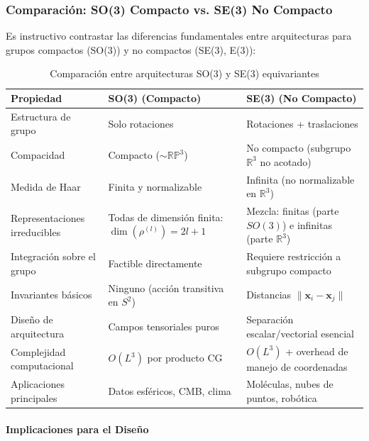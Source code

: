 \subsubsection{Comparación: SO(3) Compacto vs. SE(3) No Compacto}\label{subsubsec:so3_vs_se3_comparison}

Es instructivo contrastar las diferencias fundamentales entre arquitecturas para grupos compactos (SO(3)) y no compactos (SE(3), E(3)):

\begin{table}[h]
\centering
\begin{tabular}{|p{}|p{}|p{}|}
\hline
\textbf{Propiedad} & \textbf{SO(3) (Compacto)} & \textbf{SE(3) (No Compacto)} \\
\hline
Estructura de grupo & Solo rotaciones & Rotaciones + traslaciones \\
\hline
Compacidad & Compacto ($\sim \mathbb{RP}^3$) & No compacto (subgrupo $\mathbb{R}^3$ no acotado) \\
\hline
Medida de Haar & Finita y normalizable & Infinita (no normalizable en $\mathbb{R}^3$) \\
\hline
Representaciones irreducibles & Todas de dimensión finita: $\dim(\rho^{(l)}) = 2l+1$ & Mezcla: finitas (parte $SO(3)$) e infinitas (parte $\mathbb{R}^3$) \\
\hline
Integración sobre el grupo & Factible directamente & Requiere restricción a subgrupo compacto \\
\hline
Invariantes básicos & Ninguno (acción transitiva en $S^2$) & Distancias $\|\mathbf{x}_i - \mathbf{x}_j\|$ \\
\hline
Diseño de arquitectura & Campos tensoriales puros & Separación escalar/vectorial esencial \\
\hline
Complejidad computacional & $O(L^3)$ por producto CG & $O(L^3)$ + overhead de manejo de coordenadas \\
\hline
Aplicaciones principales & Datos esféricos, CMB, clima & Moléculas, nubes de puntos, robótica \\
\hline
\end{tabular}
\caption{Comparación entre arquitecturas SO(3) y SE(3) equivariantes}
\label{tab:so3_vs_se3}
\end{table}

\paragraph{Implicaciones para el Diseño}

